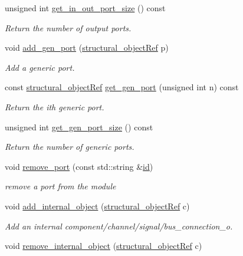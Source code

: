 \begin{DoxyCompactItemize}
unsigned int \hyperlink{classmodule_ad33fb298d79ed9faf5531a41b5f8e647}{get\+\_\+in\+\_\+out\+\_\+port\+\_\+size} () const
\begin{DoxyCompactList}\small\item\em Return the number of output ports. \end{DoxyCompactList}\item 
void \hyperlink{classmodule_aab9694a0d46f17a42a2dc52200414677}{add\+\_\+gen\+\_\+port} (\hyperlink{structural__objects_8hpp_a8ea5f8cc50ab8f4c31e2751074ff60b2}{structural\+\_\+object\+Ref} p)
\begin{DoxyCompactList}\small\item\em Add a generic port. \end{DoxyCompactList}\item 
const \hyperlink{structural__objects_8hpp_a8ea5f8cc50ab8f4c31e2751074ff60b2}{structural\+\_\+object\+Ref} \hyperlink{classmodule_aa5c197d6bc4ebaac479f48b03cef4388}{get\+\_\+gen\+\_\+port} (unsigned int n) const
\begin{DoxyCompactList}\small\item\em Return the ith generic port. \end{DoxyCompactList}\item 
unsigned int \hyperlink{classmodule_a5e09736fa2af5dd429e02ae2f90d389b}{get\+\_\+gen\+\_\+port\+\_\+size} () const
\begin{DoxyCompactList}\small\item\em Return the number of generic ports. \end{DoxyCompactList}\item 
void \hyperlink{classmodule_af90fb820c14a242b9013852a3f18867a}{remove\+\_\+port} (const std\+::string \&\hyperlink{classstructural__object_a841a75f6e349ff7c1987dc92d4ac33a6}{id})
\begin{DoxyCompactList}\small\item\em remove a port from the module \end{DoxyCompactList}\item 
void \hyperlink{classmodule_a7d1b70b4339dd86910a5d1cbb9ce314f}{add\+\_\+internal\+\_\+object} (\hyperlink{structural__objects_8hpp_a8ea5f8cc50ab8f4c31e2751074ff60b2}{structural\+\_\+object\+Ref} c)
\begin{DoxyCompactList}\small\item\em Add an internal component/channel/signal/bus\+\_\+connection\+\_\+o. \end{DoxyCompactList}\item 
void \hyperlink{classmodule_aed03c64400a4ccff10f43e117e21c923}{remove\+\_\+internal\+\_\+object} (\hyperlink{structural__objects_8hpp_a8ea5f8cc50ab8f4c31e2751074ff60b2}{structural\+\_\+object\+Ref} c)

\end{DoxyCompactItemize}
